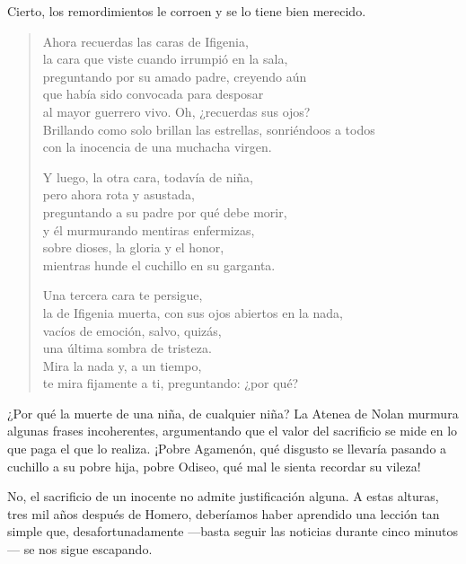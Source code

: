 \documentclass[11pt,a4paper]{article}
\begin{document}
Cierto, los remordimientos le corroen y se lo tiene bien merecido.

\begin{verse}
Ahora recuerdas las caras de Ifigenia,\\
la cara que viste cuando irrumpió en la sala,\\
preguntando por su amado padre, creyendo aún\\
que había sido convocada para desposar\\
al mayor guerrero vivo. Oh, ¿recuerdas sus ojos?\\
Brillando como solo brillan las estrellas, sonriéndoos a todos\\
con la inocencia de una muchacha virgen.

Y luego, la otra cara, todavía de niña,\\
pero ahora rota y asustada,\\
preguntando a su padre por qué debe morir,\\
y él murmurando mentiras enfermizas,\\
sobre dioses, la gloria y el honor,\\
mientras hunde el cuchillo en su garganta.

Una tercera cara te persigue,\\
la de Ifigenia muerta, con sus ojos abiertos en la nada,\\
vacíos de emoción, salvo, quizás,\\
una última sombra de tristeza.\\
Mira la nada y, a un tiempo,\\
te mira fijamente a ti, preguntando: ¿por qué?
\end{verse}

¿Por qué la muerte de una niña, de cualquier niña? La Atenea de Nolan murmura algunas frases incoherentes, argumentando que el valor del sacrificio se mide en lo que paga el que lo realiza. ¡Pobre Agamenón, qué disgusto se llevaría pasando a cuchillo a su pobre hija, pobre Odiseo, qué mal le sienta recordar su vileza!

No, el sacrificio de un inocente no admite justificación alguna. A estas alturas, tres mil años después de Homero, deberíamos haber aprendido una lección tan simple que, desafortunadamente ---basta seguir las noticias durante cinco minutos--- se nos sigue escapando.
\end{document}
